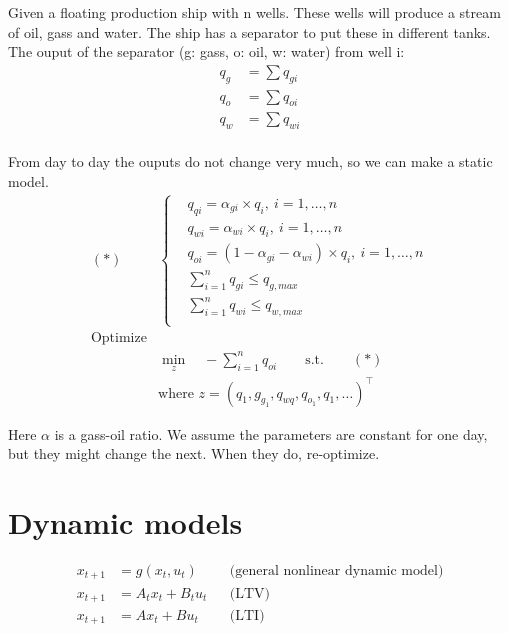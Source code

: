 \documentclass{article}
\begin{document}
Given a floating production ship with n wells. These wells will produce a stream of oil, gass and water. The ship has a separator to put these in different tanks.
The ouput of the separator (g: gass, o: oil, w: water) from well i:
\begin{align*}
  q_g & = \sum q_{gi} \\
  q_o & = \sum q_{oi} \\
  q_w & = \sum q_{wi} \\
\end{align*}

From day to day the ouputs do not change very much, so we can make a static model.
\begin{align*}
  (*)             & \left\{
  \begin{aligned}
     & q_{qi} = \alpha_{gi} \times q_i,\  i = 1,\dots,n                     \\
     & q_{wi} = \alpha_{wi} \times q_i,\  i = 1,\dots,n                     \\
     & q_{oi} = (1 - \alpha_{gi} - \alpha_{wi}) \times q_i,\  i = 1,\dots,n \\
     & \sum_{i = 1}^{n} q_{gi} \leq q_{g, max}                              \\
     & \sum_{i = 1}^{n} q_{wi} \leq q_{w, max}                              \\
  \end{aligned}
  \right.                                                                                \\
  \text{Optimize} &                                                                      \\
                  & \min_{z}\quad-\sum_{i = 1}^{n}q_{oi} \qquad\text{s.t.}\qquad (*)     \\
                  & \text{where } z = (q_1, g_{g_1}, q_{wq}, q_{o_1}, q_1, \dots)^{\top}
\end{align*}

Here $\alpha$ is a gass-oil ratio. We assume the parameters are constant for one day, but they might change the next. When they do,
re-optimize.

\section{Dynamic models}
\begin{align*}
  x_{t+1} &= g(x_t, u_t)       && \text{(general nonlinear dynamic model)} \\
  x_{t+1} &= A_t x_t + B_t u_t && \text{(LTV)} \\
  x_{t+1} &= A x_t + Bu_t     && \text{(LTI)}
\end{align*}
\end{document}
